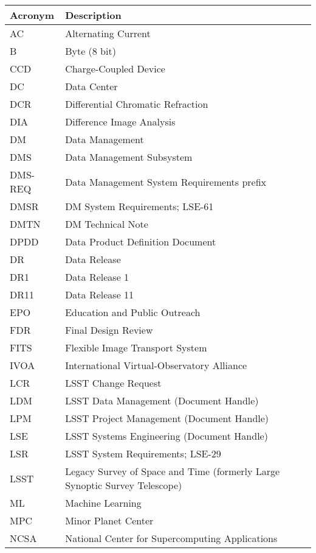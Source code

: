\addtocounter{table}{-1}
\begin{longtable}{p{}p{}}\hline
\textbf{Acronym} & \textbf{Description}  \\\hline

AC & Alternating Current \\\hline
B & Byte (8 bit) \\\hline
CCD & Charge-Coupled Device \\\hline
DC & Data Center \\\hline
DCR & Differential Chromatic Refraction \\\hline
DIA & Difference Image Analysis \\\hline
DM & Data Management \\\hline
DMS & Data Management Subsystem \\\hline
DMS-REQ & Data Management System Requirements prefix \\\hline
DMSR & DM System Requirements; LSE-61 \\\hline
DMTN & DM Technical Note \\\hline
DPDD & Data Product Definition Document \\\hline
DR & Data Release \\\hline
DR1 & Data Release 1 \\\hline
DR11 & Data Release 11 \\\hline
EPO & Education and Public Outreach \\\hline
FDR & Final Design Review \\\hline
FITS & Flexible Image Transport System \\\hline
IVOA & International Virtual-Observatory Alliance \\\hline
LCR & LSST Change Request \\\hline
LDM & LSST Data Management (Document Handle) \\\hline
LPM & LSST Project Management (Document Handle) \\\hline
LSE & LSST Systems Engineering (Document Handle) \\\hline
LSR & LSST System Requirements; LSE-29 \\\hline
LSST & Legacy Survey of Space and Time (formerly Large Synoptic Survey Telescope) \\\hline
ML & Machine Learning \\\hline
MPC & Minor Planet Center \\\hline
NCSA & National Center for Supercomputing Applications \\\hline

\end{longtable}
